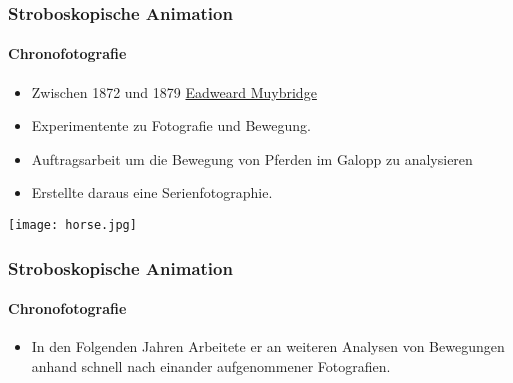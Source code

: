 \begin{frame}
    \frametitle{Stroboskopische Animation}
    \framesubtitle{Chronofotografie}
    \begin{minipage}{0.5\textwidth}
        \begin{itemize}
            \item Zwischen 1872 und 1879 \href{https://de.wikipedia.org/wiki/Eadweard_Muybridge}{Eadweard Muybridge}
            \item Experimentente zu Fotografie und Bewegung.
            \item Auftragsarbeit um die Bewegung von Pferden im Galopp zu analysieren
            \item Erstellte daraus eine Serienfotographie.

        \end{itemize}
    \end{minipage} \hfill
    \begin{minipage}{0.45\textwidth}
        \texttt{[image: horse.jpg]}
    \end{minipage}
\end{frame}

\begin{frame}
    \frametitle{Stroboskopische Animation}
    \framesubtitle{Chronofotografie}
    \begin{minipage}{0.5\textwidth}
        \begin{itemize}
            \item In den Folgenden Jahren Arbeitete er an weiteren Analysen von Bewegungen anhand schnell nach einander aufgenommener Fotografien.
        \end{itemize}
    \end{minipage} \hfill
    \begin{minipage}{0.45\textwidth}
    \end{minipage}
\end{frame}

